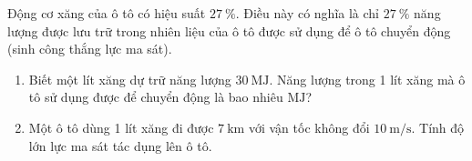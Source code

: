 \begin{ex}
	Động cơ xăng của ô tô có hiệu suất $\SI{27}{\percent}$. Điều này có nghĩa là chỉ $\SI{27}{\percent}$ năng lượng được lưu trữ trong nhiên liệu của ô tô được sử dụng để ô tô chuyển động (sinh công thắng lực ma sát).
	\begin{enumerate}[label=\alph*)]
		\item Biết một lít xăng dự trữ năng lượng $\SI{30}{\mega\joule}$. Năng lượng trong 1 lít xăng mà ô tô sử dụng được để chuyển động là bao nhiêu $\si{\mega\joule}$?
		\item Một ô tô dùng 1 lít xăng đi được $
		\SI{7}{\kilo\meter}$ với vận tốc không đổi $\SI{10}{\meter/\second}$. Tính độ lớn lực ma sát tác dụng lên ô tô.
	\end{enumerate}
\end{ex}
